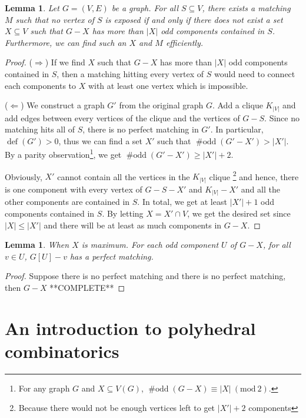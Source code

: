 \documentclass{tufte-handout}
\newtheorem{lem}[thm]{Lemma}
\theoremstyle{definition}
\theoremstyle{remark}
\newcommand{\Mod}[1]{\ (\text{mod}\ #1)}
\DeclareMathOperator{\odd}{\#odd}
\DeclareMathOperator{\defic}{def}
\begin{document}
\begin{lem}
	Let $G= (V,E)$ be a graph. For all $S \subseteq V$, there exists a matching $M$ such that no vertex of $S$ is exposed if and only if there does not exist a set $X \subseteq V$ such that $G-X$ has more than $|X|$ odd components contained in $S$. Furthermore, we can find such an $X$ and $M$ efficiently.
\end{lem}
\begin{proof}
	($\Rightarrow$) If we find $X$ such that $G-X$ has more than $|X|$ odd components contained in $S$, then a matching hitting every vertex of $S$ would need to connect each components to $X$ with at least one vertex which is impossible.
	
	($\Leftarrow$) We construct a graph $G'$ from the original graph $G$. Add a clique $K_{|V|}$ and add edges between every vertices of the clique and the vertices of $G-S$. Since no matching hits all of $S$, there is no perfect matching in $G'$. In particular, $\defic(G') > 0$, thus we can find a set $X'$ such that $\odd(G'-X') > |X'|$. By a parity observation\footnote{For any graph $G$ and $X \subseteq V(G)$, $\odd(G-X) \equiv |X| \Mod{2}$.}, we get $\odd(G'-X') \geq |X'| +2$.
	
	Obviously, $X'$ cannot contain all the vertices in the $K_{|V|}$ clique \footnote{Because there would not be enough vertices left to get $|X'| + 2$ components} and hence, there is one component with every vertex of $G-S-X'$ and $K_{|V|} - X'$ and all the other components are contained in $S$. In total, we get at least $|X'| + 1$ odd components contained in $S$. By letting $X = X' \cap V$, we get the desired set since $|X| \leq |X'|$ and there will be at least as much components in $G-X$.
\end{proof}
\begin{lem}
	When $X$ is maximum. For each odd component $U$ of $G-X$, for all $v \in U$, $G[U] - v$ has a perfect matching.
\end{lem}
\begin{proof}
	Suppose there is no perfect matching and there is no perfect matching, then $G-X$ **COMPLETE**
\end{proof}
\section{An introduction to polyhedral combinatorics}
\end{document}
